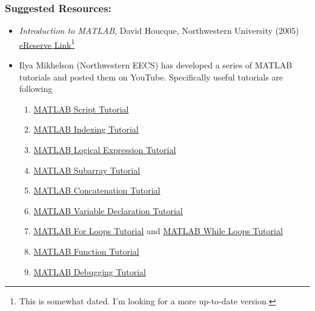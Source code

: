 \subsubsection*{Suggested Resources:} 
		\begin{itemize}
			\item	\textit{Introduction to MATLAB}, David Houcque, Northwestern University (2005) \href{https://northwestern.box.com/s/13myp0an8snmmfjqfbx9gt1gbfrah0aj}{eReserve Link}\footnote{This is somewhat dated. I'm looking for a more up-to-date version.} %
			\item Ilya Mikhelson (Northwestern EECS) has developed a series of MATLAB tutorials and posted them on YouTube. Specifically useful tutorials are following
				\begin{enumerate}
					\item \href{https://www.youtube.com/watch?v=n1a4g2Z8Lb8&list=PL1ec5YBm_crwcmeR8pKB9shvnriE8UbFE&index=1}{MATLAB Script Tutorial}
					\item \href{https://www.youtube.com/watch?v=JE7I4Krj1PU&list=PL1ec5YBm_crwcmeR8pKB9shvnriE8UbFE&index=2}{MATLAB Indexing Tutorial}
					\item \href{https://www.youtube.com/watch?v=HfRv3NMV6Ys&list=PL1ec5YBm_crwcmeR8pKB9shvnriE8UbFE&index=3}{MATLAB Logical Expression Tutorial}
					\item \href{https://www.youtube.com/watch?v=HfRv3NMV6Ys&list=PL1ec5YBm_crwcmeR8pKB9shvnriE8UbFE&index=6}{MATLAB Subarray Tutorial}
					\item \href{https://www.youtube.com/watch?v=HfRv3NMV6Ys&list=PL1ec5YBm_crwcmeR8pKB9shvnriE8UbFE&index=7}{MATLAB Concatenation Tutorial}
					\item \href{https://www.youtube.com/watch?v=HfRv3NMV6Ys&list=PL1ec5YBm_crwcmeR8pKB9shvnriE8UbFE&index=8}{MATLAB Variable Declaration Tutorial}
					\item \href{https://www.youtube.com/watch?v=HfRv3NMV6Ys&list=PL1ec5YBm_crwcmeR8pKB9shvnriE8UbFE&index=10}{MATLAB For Loops Tutorial} and \href{https://www.youtube.com/watch?v=HfRv3NMV6Ys&list=PL1ec5YBm_crwcmeR8pKB9shvnriE8UbFE&index=11}{MATLAB While Loops Tutorial}
					\item \href{https://www.youtube.com/watch?v=HfRv3NMV6Ys&list=PL1ec5YBm_crwcmeR8pKB9shvnriE8UbFE&index=12}{MATLAB Function Tutorial}
					\item \href{https://www.youtube.com/watch?v=HfRv3NMV6Ys&list=PL1ec5YBm_crwcmeR8pKB9shvnriE8UbFE&index=13}{MATLAB Debugging Tutorial}
				\end{enumerate}
			\end{itemize}


